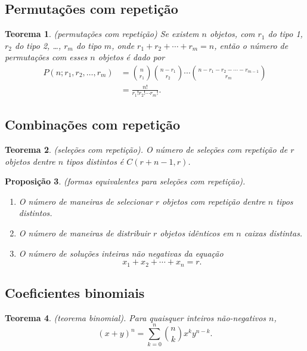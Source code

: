 \documentclass{article}
\theoremstyle{plain}
\newtheorem{thm}{Teorema}[section]
\newtheorem{prop}[thm]{Proposição}
\theoremstyle{definition}
\theoremstyle{remark}
\begin{document}
\subsection{Permutações com repetição}

\begin{thm} (permutações com repetição)
    Se existem \(n\) objetos, com \(r_1\) do tipo 1, \(r_2\) do tipo 2, \ldots, \(r_m\) do tipo \(m\), onde \(r_1 + r_2 + \cdots + r_m = n\), então o número de permutações com esses \(n\) objetos é dado por
    \begin{align}
        P(n;r_1,r_2,\ldots,r_m) &= \binom{n}{r_1}\binom{n-r_1}{r_2}\cdots\binom{n-r_1-r_2-\cdots-r_{m-1}}{r_m} \\
        &= \frac{n!}{r_1!r_2!\cdots r_m!}.
    \end{align}
\end{thm}

\subsection{Combinações com repetição}

\begin{thm} (seleções com repetição).
    O número de seleções com repetição de \(r\) objetos dentre \(n\) tipos distintos é \(C(r+n-1,r)\).
\end{thm}

\begin{prop} (formas equivalentes para seleções com repetição).
    \begin{enumerate}
        \item O número de maneiras de selecionar \(r\) objetos com repetição dentre \(n\) tipos distintos.
        \item O número de maneiras de distribuir \(r\) objetos idênticos em \(n\) caixas distintas.
        \item O número de soluções inteiras não negativas da equação
        \begin{equation}
            x_1 + x_2 + \cdots + x_n = r.
        \end{equation}
    \end{enumerate}
\end{prop}

\subsection{Coeficientes binomiais}

\begin{thm} (teorema binomial).
    Para quaisquer inteiros não-negativos \(n\),
    \begin{equation}
        (x+y)^n = \sum_{k=0}^{n} \binom{n}{k} x^k y^{n-k}.
    \end{equation}
\end{thm}
\end{document}
